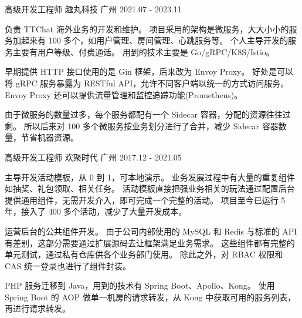 

\begin{cventries}

  \cventry
    {高级开发工程师} %
    {趣丸科技} %
    {广州} %
    {2021.07 - 2023.11} %
    {
      \begin{cvitems} %
        \item
        {
          负责 TTChat 海外业务的开发和维护。
          项目采用的架构是微服务，大大小小的服务加起来有 100 多个，如用户管理、房间管理、心跳服务等。
          个人主导开发的服务主要有用户等级、付费通话。
          用到的技术主要是 Go/gRPC/K8S/Istio。
        }
        \item {
          早期提供 HTTP 接口使用的是 Gin 框架，后来改为 Envoy Proxy。
          好处是可以将 gRPC 服务暴露为 RESTful API，允许不同客户端以统一的方式访问服务。
          Envoy Proxy 还可以提供流量管理和监控追踪功能(Prometheus)。
        }
        \item {
          由于微服务的数量过多，每个服务都配有一个 Sidecar 容器，分配的资源往往过剩。
          所以后来对 100 多个微服务按业务划分进行了合并，减少 Sidecar 容器数量，节省机器资源。
        }
      \end{cvitems}
    }

  \cventry
    {高级开发工程师} %
    {欢聚时代} %
    {广州} %
    {2017.12 - 2021.05} %
    {
      \begin{cvitems} %
        \item
        {
          主导开发活动模板，从 0 到 1，可本地演示。
          业务发展过程中有⼤量的重复组件如抽奖、礼包领取、相关任务。
          活动模板直接把强业务相关的玩法通过配置后台提供通用组件，无需开发介⼊，即可完成⼀个完整的活动。
          项目⾄今已运行 5 年，接入了 400 多个活动，减少了⼤量开发成本。
        }
        \item
        {
          运营后台的公共组件开发。
          由于公司内部使用的 MySQL 和 Redis 与标准的 API 有差别，这部分需要通过扩展源码去让框架满足业务需求。
          这些组件都有完整的单元测试，通过私有仓库供各个业务部门使用。
          除此之外，对 RBAC 权限和 CAS 统⼀登录也进行了组件封装。
        }
        \item
        {
          PHP 服务迁移到 Java，⽤到的技术有 Spring Boot、Apollo、Kong。
          使⽤ Spring Boot 的 AOP 做单⼀机房的请求转发，从 Kong 中获取可⽤的服务列表，再进⾏请求转发。
        }
      \end{cvitems}
    }


\end{cventries}

